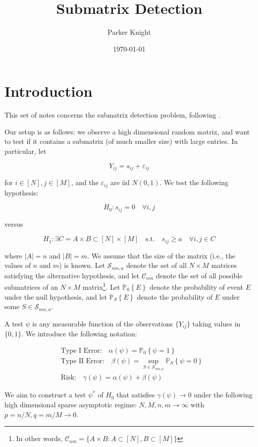 \documentclass[11pt]{article}
\author{Parker Knight}
\date{\today}
\title{Submatrix Detection}
\newcommand{\cC}{\mathcal{C}}
\newcommand{\cS}{\mathcal{S}}
\newcommand{\probover}[2]{\mathbb{P}_{#2}\left\{#1\right\}}
\newcommand{\eps}{\varepsilon} %
\begin{document}
\maketitle

\section{Introduction}

This set of notes concerns the submatrix detection problem, following
\cite{butucea_detection_2013}. 


Our setup is as follows: we observe a high dimensional random matrix, and want to test if it contains a submatrix (of much smaller size) with large entries. In particular, let

$$Y_{ij} = s_{ij} + \eps_{ij}$$

for $i \in [N], j \in [M]$, and the $\eps_{ij}$ are iid $N(0,1)$. We test the following hypothesis:

$$H_0: s_{ij} = 0 \quad \forall i,j$$

versus

$$H_1: \exists C = A \times B \subset [N] \times [M] \quad \textrm{s.t.} 
\quad s_{ij} \geq a \quad \forall i,j \in C$$

where $|A| = n$ and $|B| = m$. We assume that the size of the matrix (i.e., the
values of $n$ and $m$) is known. Let $\cS_{nm,a}$ denote the set of all $N
\times M$ matrices satisfying the alternative hypothesis, and let $\cC_{nm}$
denote the set of all possible submatrices of an $N \times M$ matrix\footnote{In
other words, $\cC_{nm} = \{A \times B : A \subset [N], B \subset [M]\}$}. Let
$\probover{E}{0}$ denote the probability of event $E$ under the null hypothesis,
and let $\probover{E}{S}$ denote the probability of $E$ under some $S \in \cS_{nm,a}$.

A test $\psi$ is any measurable function of the observations $\{Y_{ij}\}$ taking
values in $\{0,1\}$. We introduce the following notation:

\begin{align*}
	&\textrm{Type I Error:} \quad \alpha(\psi) = \probover{\psi = 1}{0} \\
	&\textrm{Type II Error:} \quad \beta(\psi) = \sup_{S \in \cS_{nm,a}}\probover{\psi = 0}{S}\\
	&\textrm{Risk:} \quad \gamma(\psi) = \alpha(\psi) + \beta(\psi)
\end{align*} 

We aim to construct a test $\psi^*$ of $H_0$ that satisfies $\gamma(\psi)
\rightarrow 0$ under the following high dimensional sparse asymptotic regime: $N,M,n,m
\rightarrow \infty$ with $p = n/N, q = m/M \rightarrow 0$. 



\end{document}
